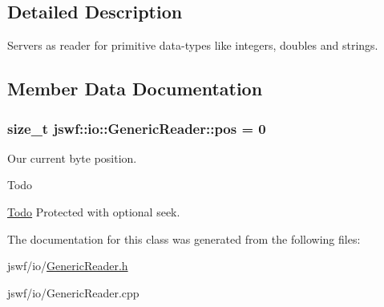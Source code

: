 \subsection{Detailed Description}
Servers as reader for primitive data-\/types like integers, doubles and strings. 

\subsection{Member Data Documentation}
\hypertarget{classjswf_1_1io_1_1_generic_reader_a29dcfa1317485ea04e6caef568e803ce}{
\subsubsection[{pos}]{\setlength{\rightskip}{0pt plus 5cm}size\+\_\+t jswf\+::io\+::\+Generic\+Reader\+::pos = 0}}\label{classjswf_1_1io_1_1_generic_reader_a29dcfa1317485ea04e6caef568e803ce}


Our current byte position. 

\begin{DoxyRefDesc}{Todo}
\item[\hyperlink{todo__todo000022}{Todo}]Protected with optional seek. \end{DoxyRefDesc}


The documentation for this class was generated from the following files\+:\begin{DoxyCompactItemize}
\item 
jswf/io/\hyperlink{_generic_reader_8h}{Generic\+Reader.\+h}\item 
jswf/io/Generic\+Reader.\+cpp\end{DoxyCompactItemize}
